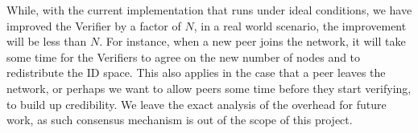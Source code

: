 While, with the current implementation that runs under ideal conditions, we have improved the Verifier by a factor of $N$,
in a real world scenario, the improvement will be less than $N$.
For instance, when a new peer joins the network, it will take some time for the Verifiers to agree on the new number of nodes
and to redistribute the ID space.
This also applies in the case that a peer leaves the network, or perhaps we want to allow peers some time before they start verifying,
to build up credibility.
We leave the exact analysis of the overhead for future work, as such consensus mechanism is out of the scope of this project.
